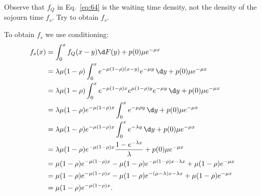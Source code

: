 \begin{exercise}
  Observe that $f_Q$ in Eq.~\cref{eq:64} is the waiting time density, not the
  density of the sojourn time $f_s$. Try to obtain $f_s$.
\begin{solution}
    To obtain $f_s$ we use conditioning:
\begin{align*}
f_s(x)
&= \int_0^x f_Q(x-y) \d F(y) + p(0) \mu e^{-\mu x} \\
&= \lambda \mu (1-\rho) \int_0^x  e^{- \mu(1-\rho)(x-y)} e^{-\mu y} \,\d y + p(0) \mu e^{-\mu x} \\
&= \lambda \mu (1-\rho) \int_0^x  e^{- \mu(1-\rho)x} e^{\mu(1-\rho)y} e^{-\mu y} \,\d y + p(0) \mu e^{-\mu x} \\
&= \lambda \mu (1-\rho) e^{- \mu(1-\rho)x} \int_0^x  e^{- \mu \rho y} \, \d y + p(0) \mu e^{-\mu x} \\
&= \lambda \mu (1-\rho) e^{- \mu(1-\rho)x} \int_0^x  e^{- \lambda y} \,\d y + p(0) \mu e^{-\mu x} \\
&= \lambda \mu (1-\rho) e^{- \mu(1-\rho)x} \frac{1 - e^{- \lambda x}}{\lambda} + p(0) \mu e^{-\mu x} \\
&= \mu (1-\rho) e^{- \mu(1-\rho)x} - \mu (1-\rho) e^{- \mu(1-\rho)x - \lambda x} + \mu (1-\rho) e^{-\mu x} \\
&= \mu (1-\rho) e^{- \mu(1-\rho)x} - \mu (1-\rho) e^{- (\mu - \lambda) x - \lambda x} + \mu (1-\rho) e^{-\mu x} \\
&= \mu (1-\rho) e^{- \mu(1-\rho)x}.
\end{align*}
\end{solution}
\end{exercise}
